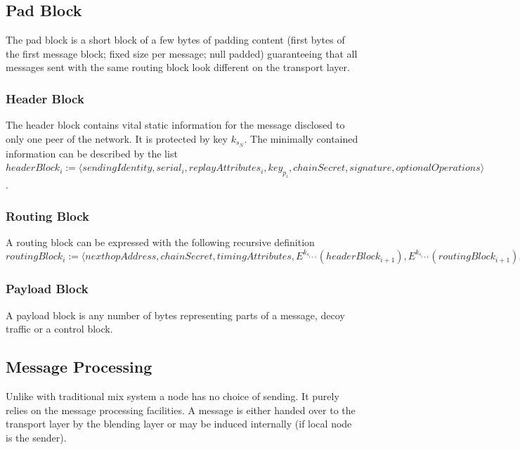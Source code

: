 \documentclass[9pt,journal,compsoc]{IEEEtran}
\begin{document}
\subsection{Pad Block}
The pad block is a short block of a few bytes of padding content (first bytes of the first message block; fixed size per message; null padded) guaranteeing that all messages sent with the same routing block look different on the transport layer.

\subsubsection{Header Block}
The header block contains vital static information for the message disclosed to only one peer of the network. It is protected by key $k_{s_N}$. The minimally contained information can be described by the list $headerBlock_i:=\langle sendingIdentity,\allowbreak{} serial_i,\allowbreak{} replayAttributes_i,\allowbreak{} key_{p_i},\allowbreak{} chainSecret,\allowbreak{} signature,\allowbreak{} optionalOperations \rangle$.

\subsubsection{Routing Block}
A routing block can be expressed with the following recursive definition $routingBlock_i:=\langle\allowbreak{} nexthopAddress,\allowbreak{} chainSecret,\allowbreak{} timingAttributes,\allowbreak{} E^{k_{s_{i+1}}}\left(headerBlock_{i+1}\right),\allowbreak{} E^{k_{s_{i+1}}}\left(routingBlock_{i+1}\right),\allowbreak{} payloadBuildInstructions_i,\allowbreak{} payloadId,\allowbreak{} optionalReplyBlocks \rangle$

\subsubsection{Payload Block}
A payload block is any number of bytes representing parts of a message, decoy traffic or a control block.

\subsection{Message Processing\label{sec:processing}}
Unlike with traditional mix system a node has no choice of sending. It purely relies on the message processing facilities. A message is either handed over to the transport layer by the blending layer or may be induced internally (if local node is the sender). 
\end{document}
